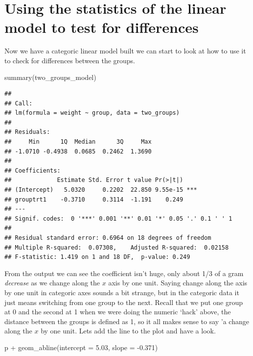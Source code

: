 \documentclass[
]{book}
\newenvironment{Shaded}{\begin{snugshade}}{\end{snugshade}}
\newcommand{\AttributeTok}[1]{\textcolor[rgb]{0.77,0.63,0.00}{#1}}
\newcommand{\FloatTok}[1]{\textcolor[rgb]{0.00,0.00,0.81}{#1}}
\newcommand{\FunctionTok}[1]{\textcolor[rgb]{0.00,0.00,0.00}{#1}}
\newcommand{\NormalTok}[1]{#1}
\newcommand{\SpecialCharTok}[1]{\textcolor[rgb]{0.00,0.00,0.00}{#1}}
\begin{document}
\hypertarget{using-the-statistics-of-the-linear-model-to-test-for-differences}{%
\section{Using the statistics of the linear model to test for differences}\label{using-the-statistics-of-the-linear-model-to-test-for-differences}}

Now we have a categoric linear model built we can start to look at how to use it to check for differences between the groups.

\begin{Shaded}
\begin{Highlighting}[]
\FunctionTok{summary}\NormalTok{(two\_groups\_model)}
\end{Highlighting}
\end{Shaded}

\begin{verbatim}
## 
## Call:
## lm(formula = weight ~ group, data = two_groups)
## 
## Residuals:
##     Min      1Q  Median      3Q     Max 
## -1.0710 -0.4938  0.0685  0.2462  1.3690 
## 
## Coefficients:
##             Estimate Std. Error t value Pr(>|t|)    
## (Intercept)   5.0320     0.2202  22.850 9.55e-15 ***
## grouptrt1    -0.3710     0.3114  -1.191    0.249    
## ---
## Signif. codes:  0 '***' 0.001 '**' 0.01 '*' 0.05 '.' 0.1 ' ' 1
## 
## Residual standard error: 0.6964 on 18 degrees of freedom
## Multiple R-squared:  0.07308,	Adjusted R-squared:  0.02158 
## F-statistic: 1.419 on 1 and 18 DF,  p-value: 0.249
\end{verbatim}

From the output we can see the coefficient isn't huge, only about 1/3 of a gram \emph{decrease} as we change along the \(x\) axis by one unit. Saying change along the axis by one unit in categoric axes sounds a bit strange, but in the categoric data it just means switching from one group to the next. Recall that we put one group at 0 and the second at 1 when we were doing the numeric `hack' above, the distance between the groups is defined as 1, so it all makes sense to say 'a change along the \(x\) by one unit. Lets add the line to the plot and have a look.

\begin{Shaded}
\begin{Highlighting}[]
\NormalTok{p }\SpecialCharTok{+} \FunctionTok{geom\_abline}\NormalTok{(}\AttributeTok{intercept =} \FloatTok{5.03}\NormalTok{, }\AttributeTok{slope =} \SpecialCharTok{{-}}\FloatTok{0.371}\NormalTok{)}
\end{Highlighting}
\end{Shaded}
\end{document}
